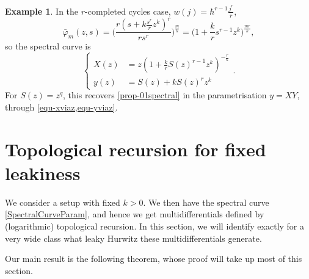 \documentclass[10pt,a4paper,oneside,no-math,reqno]{amsart}%
\theoremstyle{plain}
\theoremstyle{definition}
\newtheorem{example}[theorem]{Example}
\theoremstyle{remark}
\numberwithin{equation}{section}
\renewcommand{\phi}{\varphi}
\newcommand{\1}{\mathds{1}}
\newcommand{\<}{\langle}
\renewcommand{\>}{\rangle}
\begin{document}

\begin{example}\label{rkSC}
	In the $r$-completed cycles case, $ w(j) = \hbar^{r-1} \frac{j^r}{r}$,
	\begin{equation}
		\bar{\phi}_m (z,s) 
		=
		\Big( \frac{r(s + k \frac{s^r}{r} z^k )^r}{r s^r}\Big)^{\frac{m}{k}}
		=
		\big( 1 + \frac{k}{r} s^{r-1} z^k \big)^{\frac{mr}{k}},
	\end{equation}
    so the spectral curve is
    \begin{equation}
        \begin{cases}
            X(z)
            &=
            z (1 + \frac{k}{r} S(z)^{r-1} z^k )^{-\frac{r}{k}}
            \\
            y(z)
            &=
            S(z) + k S(z)^r z^k
        \end{cases}.
    \end{equation}
    For $ S(z) = z^q$, this recovers \cref{prop-01spectral} in the parametrisation $ y = XY $, through \cref{equ-xviaz,equ-yviaz}.
\end{example}



\section{Topological recursion for fixed leakiness} \label{sec:TR}

We consider a setup with fixed $ k > 0$. We then have the spectral curve \eqref{SpectralCurveParam}, and hence we get multidifferentials defined by (logarithmic) topological recursion. In this section, we will identify exactly for a very wide class what leaky Hurwitz these multidifferentials generate.

Our main result is the following theorem, whose proof will take up most of this section.
\end{document}
